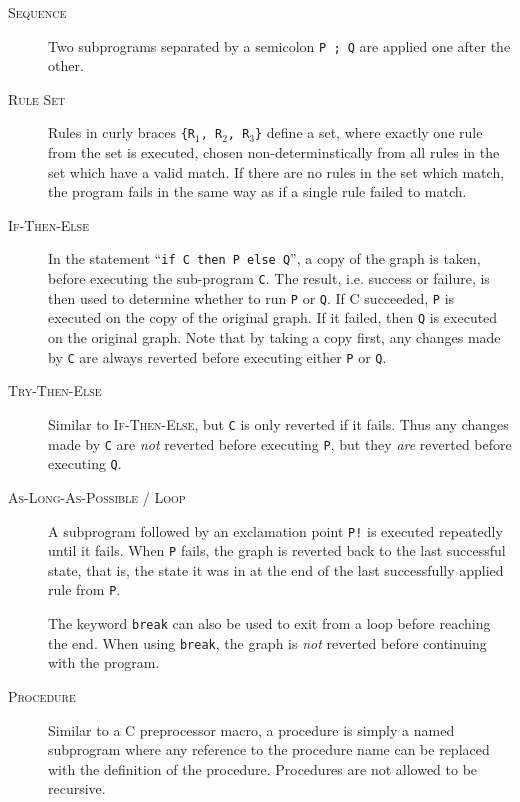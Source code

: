 \documentclass[authoryearcitations]{UoYCSproject}
\begin{document}
\begin{description}
    \item[\textsc{Sequence}]
    Two subprograms separated by a semicolon \texttt{P ; Q} are applied
    one after the other.

    \item[\textsc{Rule Set}]
    Rules in curly braces \texttt{\{R$_{\text{1}}$, R$_{\text{2}}$, R$_{\text{3}}$\}}
    define a set, where exactly one rule from the set is executed, chosen
    non-determinstically from all rules in the set which have a valid match.
    If there are no rules in the set which match, the program fails in the
    same way as if a single rule failed to match.

    \item[\textsc{If-Then-Else}]
    In the statement ``\texttt{if C then P else Q}'', a copy of the graph is taken,
    before executing the sub-program \texttt{C}. The result, i.e. success or failure,
    is then used to determine whether to run \texttt{P} or \texttt{Q}. If C succeeded,
    \texttt{P} is executed on the copy of the original graph. If it failed, then
    \texttt{Q} is executed on the original graph. Note that by taking a copy first,
    any changes made by \texttt{C} are always reverted before executing either
    \texttt{P} or \texttt{Q}.

    \item[\textsc{Try-Then-Else}]
    Similar to \textsc{If-Then-Else}, but \texttt{C} is only reverted if it fails.
    Thus any changes made by \texttt{C} are \emph{not} reverted before executing
    \texttt{P}, but they \emph{are} reverted before executing \texttt{Q}.

    \item[\textsc{As-Long-As-Possible} / \textsc{Loop}]
    A subprogram followed by an exclamation point \texttt{P!} is executed
    repeatedly until it fails. When \texttt{P} fails, the graph is reverted back
    to the last successful state, that is, the state it was in at the end of the
    last successfully applied rule from \texttt{P}.

    The keyword \texttt{break} can also be used to exit from a loop before reaching
    the end. When using \texttt{break}, the graph is \emph{not} reverted before
    continuing with the program.

    \item[\textsc{Procedure}]
    Similar to a C preprocessor macro, a procedure is simply a named subprogram
    where any reference to the procedure name can be replaced with the definition
    of the procedure. Procedures are not allowed to be recursive.


\end{description}
\end{document}
